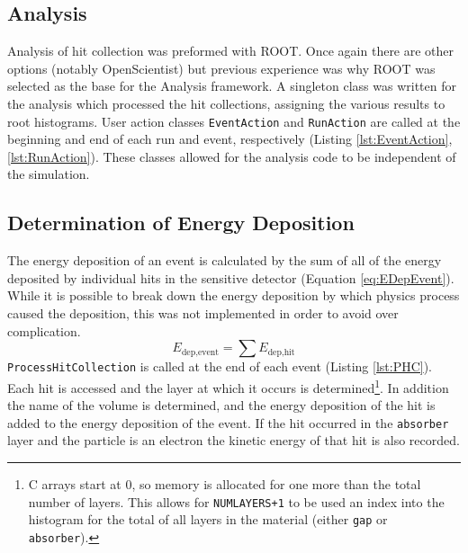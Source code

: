 \subsection{Analysis}

Analysis of hit collection was preformed with ROOT.  Once again there are other options (notably OpenScientist) but previous experience was why ROOT was selected as the base for the Analysis framework.
A singleton class was written for the analysis which processed the hit collections, assigning the various results to root histograms.
User action classes \verb+EventAction+ and \verb+RunAction+ are called at the beginning and end of each run and event, respectively (Listing \ref{lst:EventAction},\ref{lst:RunAction}).
These classes allowed for the analysis code to be independent of the simulation.



\subsection{Determination of Energy Deposition}

The energy deposition of an event is calculated by the sum of all of the energy deposited by individual hits in the sensitive detector (Equation \ref{eq:EDepEvent}).
While it is possible to break down the energy deposition by which physics process caused the deposition, this was not implemented in order to avoid over complication.
\begin{equation}
\label{eq:EDepEvent}
E_{\text{dep},\text{event}} = \sum{E_{\text{dep},\text{hit}} }
\end{equation}
\verb+ProcessHitCollection+ is called at the end of each event (Listing \ref{lst:PHC}).
Each hit is accessed and the layer at which it occurs is determined\footnote{C arrays start at 0, so memory is allocated for one more than the total number of layers. This allows for \verb|NUMLAYERS+1| to be used an index into the histogram for the total of all layers in the material (either \verb+gap+ or \verb+absorber+). }.
In addition the name of the volume is determined, and the energy deposition of the hit is added to the energy deposition of the event.
If the hit occurred in the \verb+absorber+ layer and the particle is an electron the kinetic energy of that hit is also recorded.


